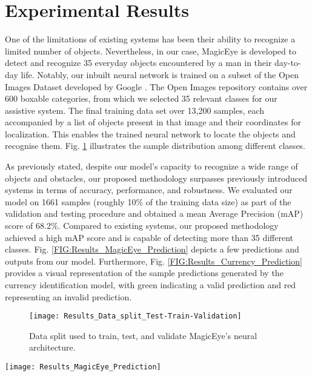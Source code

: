 \documentclass[journal,12pt,onecolumn,letterpaper]{IEEEtran}
\begin{document}
\section{Experimental Results}
\label{Sec:Experimental_Results}

One of the limitations of existing systems has been their ability to recognize a limited number of objects. Nevertheless, in our case, MagicEye is developed to detect and recognize 35 everyday objects encountered by a man in their day-to-day life. Notably, our inbuilt neural network is trained on a subset of the Open Images Dataset developed by Google \cite{kuznetsova_open_2020}. The Open Images repository contains over 600 boxable categories, from which we selected 35 relevant classes for our assistive system. The final training data set over 13,200 samples, each accompanied by a list of objects present in that image and their coordinates for localization. This enables the trained neural network to locate the objects and recognise them. Fig. \ref{FIG:Results_Data_split_Test-Train-Validation} illustrates the sample distribution among different classes.

As previously stated, despite our model's capacity to recognize a wide range of objects and obstacles, our proposed methodology surpasses previously introduced systems in terms of accuracy, performance, and robustness. We evaluated our model on 1661 samples (roughly 10\% of the training data size) as part of the validation and testing procedure and obtained a mean Average Precision (mAP) score of 68.2\%. Compared to existing systems, our proposed methodology achieved a high mAP score and is capable of detecting more than 35 different classes. Fig. \ref{FIG:Results_MagicEye_Prediction} depicts a few predictions and outputs from our model. Furthermore, Fig. \ref{FIG:Results_Currency_Prediction} provides a visual representation of the sample predictions generated by the currency identification model, with green indicating a valid prediction and red representing an invalid prediction.

\begin{figure}[htbp]
\centering
\texttt{[image: Results\_Data\_split\_Test-Train-Validation]}
\caption{Data split used to train, test, and validate MagicEye’s neural architecture.}
\label{FIG:Results_Data_split_Test-Train-Validation}
\end{figure}

\begin{figure*}[t]
\centering
	\texttt{[image: Results\_MagicEye\_Prediction]}
\caption{Predictions generated by MagicEye on a few images from validation data split.}
\label{FIG:Results_MagicEye_Prediction}
\end{figure*}
\end{document}
